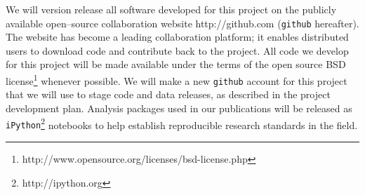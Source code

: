 We will version release all software developed for this project on the
publicly available open--source collaboration website
http://github.com ({\tt github} hereafter).  The website has become a
leading collaboration platform; it enables distributed users to
download code and contribute back to the project.  All code we develop
for this project will be made available under the terms of the open
source BSD
license\footnote{http://www.opensource.org/licenses/bsd-license.php}
whenever possible.  We will make a new {\tt github} account for this
project that we will use to stage code and data releases, as described
in the project development plan.  Analysis packages used in our
publications will be released as {\tt
  iPython}\footnote{http://ipython.org} notebooks to help establish
reproducible research standards in the field.


